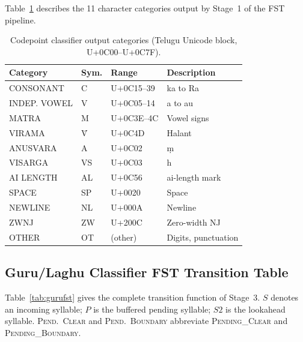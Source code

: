 \documentclass[11pt]{article}
\begin{document}
Table~\ref{tab:codepoint} describes the 11 character categories output by
Stage~1 of the FST pipeline.

\begin{table}[H]
\centering
\small
\caption{Codepoint classifier output categories (Telugu Unicode block,
U+0C00--U+0C7F).}
\label{tab:codepoint}
\begin{tabular}{p{2.3cm}lp{1.4cm}p{1.7cm}}
\toprule
\textbf{Category} & \textbf{Sym.} & \textbf{Range} & \textbf{Description} \\
\midrule
CONSONANT      & C   & U+0C15--39 & ka to Ra \\
INDEP. VOWEL   & V   & U+0C05--14 & a to au \\
MATRA          & M   & U+0C3E--4C & Vowel signs \\
VIRAMA         & V\={}& U+0C4D   & Halant \\
ANUSVARA       & A   & U+0C02     & \d{m} \\
VISARGA        & VS  & U+0C03     & h \\
AI LENGTH      & AL  & U+0C56     & ai-length mark \\
SPACE          & SP  & U+0020     & Space \\
NEWLINE        & NL  & U+000A     & Newline \\
ZWNJ           & ZW  & U+200C     & Zero-width NJ \\
OTHER          & OT  & (other)    & Digits, punctuation \\
\bottomrule
\end{tabular}
\end{table}

\subsection{Guru/Laghu Classifier FST Transition Table}

Table~\ref{tab:gurufst} gives the complete transition function of Stage~3.
$S$ denotes an incoming syllable; $P$ is the buffered pending syllable; $S2$
is the lookahead syllable. \textsc{Pend.\ Clear} and \textsc{Pend.\ Boundary}
abbreviate \textsc{Pending\_Clear} and \textsc{Pending\_Boundary}.
\end{document}
